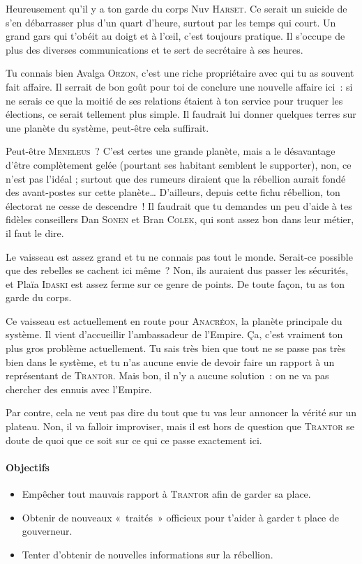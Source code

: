 {{Heureusement qu’il y a ton garde du corps Nuv \textsc{Harset}.
Ce serait un suicide de s’en débarrasser plus d’un quart d’heure, surtout par les temps qui court.
Un grand gars qui t’obéit au doigt et à l’œil, c’est toujours pratique.
Il s’occupe de plus des diverses communications et te sert de secrétaire à ses heures.

Tu connais bien Avalga \textsc{Orzon}, c’est une riche propriétaire avec qui tu as souvent fait affaire.
Il serrait de bon goût pour toi de conclure une nouvelle affaire ici~:  si ne serais ce que la moitié de ses relations étaient à ton service pour truquer les élections, ce serait tellement plus simple.
Il faudrait lui donner quelques terres sur une planète du système, peut-être cela suffirait.

Peut-être \textsc{Meneleus}~?
C’est certes une grande planète, mais a le désavantage d’être complètement gelée (pourtant ses habitant semblent le supporter), non, ce n’est pas l’idéal ; surtout que des rumeurs diraient que la rébellion aurait fondé des avant-postes sur cette planète…
D’ailleurs, depuis cette fichu rébellion, ton électorat ne cesse de descendre~!
Il faudrait que tu demandes un peu d’aide à tes fidèles conseillers Dan \textsc{Sonen} et Bran \textsc{Colek}, qui sont assez bon dans leur métier, il faut le dire.

Le vaisseau est assez grand et tu ne connais pas tout le monde.
Serait-ce possible que des rebelles se cachent ici même~?
Non, ils auraient dus passer les sécurités, et Plaïa \textsc{Idaski} est assez ferme sur ce genre de points.
De toute façon, tu as ton garde du corps.

Ce vaisseau est actuellement en route pour \textsc{Anacréon}, la planète principale du système.
Il vient d’accueillir l’ambassadeur de l’Empire.
Ça, c’est vraiment ton plus gros problème actuellement.
Tu sais très bien que tout ne se passe pas très bien dans le système, et tu n’as aucune envie de devoir faire un rapport à un représentant de \textsc{Trantor}.
Mais bon, il n’y a aucune solution~: on ne va pas chercher des ennuis avec l’Empire.

Par contre, cela ne veut pas dire du tout que tu vas leur annoncer la vérité sur un plateau.
Non, il va falloir improviser, mais il est hors de question que \textsc{Trantor} se doute de quoi que ce soit sur ce qui ce passe exactement ici.
}

\paragraph{Objectifs}{
\begin{itemize}
	\item Empêcher tout mauvais rapport à \textsc{Trantor} afin de garder sa place.
	\item Obtenir de nouveaux «~traités~» officieux pour t’aider à garder t place de gouverneur.
	\item Tenter d’obtenir de nouvelles informations sur la rébellion.
\end{itemize}
}
}


